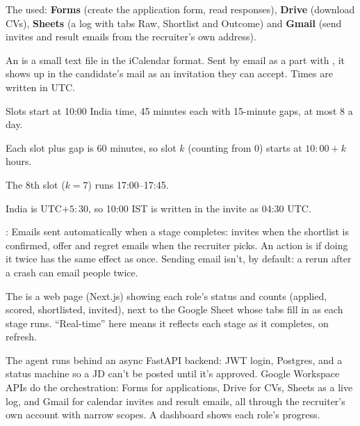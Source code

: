 \begin{definition}
The  used: \textbf{Forms} (create the application form, read responses), \textbf{Drive} (download CVs), \textbf{Sheets} (a log with tabs Raw, Shortlist and Outcome) and \textbf{Gmail} (send invites and result emails from the recruiter's own address).
\end{definition}

\begin{definition}
An  is a small text file in the iCalendar format. Sent by email as a  part with , it shows up in the candidate's mail as an invitation they can accept. Times are written in UTC.
\end{definition}

\begin{example}
Slots start at 10:00 India time, 45 minutes each with 15-minute gaps, at most 8 a day.
\begin{steps}
  \item Each slot plus gap is 60 minutes, so slot $k$ (counting from 0) starts at $10{:}00 + k$ hours.
  \item The 8th slot ($k = 7$) runs 17:00--17:45.
  \item India is UTC$+5{:}30$, so 10:00 IST is written in the invite as 04:30 UTC.
\end{steps}
\end{example}

\begin{definition}
: Emails sent automatically when a stage completes: invites when the shortlist is confirmed, offer and regret emails when the recruiter picks. An action is  if doing it twice has the same effect as once. Sending email isn't, by default: a rerun after a crash can email people twice.
\end{definition}

\begin{definition}
The  is a web page (Next.js) showing each role's status and counts (applied, scored, shortlisted, invited), next to the Google Sheet whose tabs fill in as each stage runs. ``Real-time'' here means it reflects each stage as it completes, on refresh.
\end{definition}

\begin{sayit}
The agent runs behind an async FastAPI backend: JWT login, Postgres, and a status machine so a JD can't be posted until it's approved. Google Workspace APIs do the orchestration: Forms for applications, Drive for CVs, Sheets as a live log, and Gmail for calendar invites and result emails, all through the recruiter's own account with narrow scopes. A dashboard shows each role's progress.
\end{sayit}

